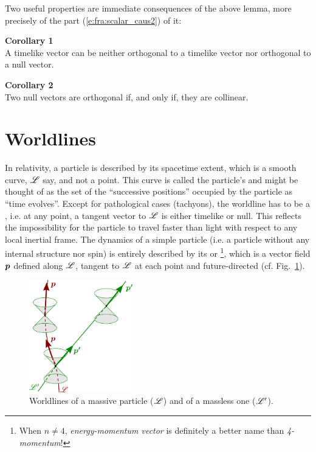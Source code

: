 Two useful properties are immediate consequences of the above lemma,
more precisely of the part (\ref{e:fra:scalar_caus2}) of it:

\begin{greybox}
\textbf{Corollary 1}\\[1ex]
A timelike vector can be neither orthogonal to a timelike vector nor
orthogonal to a null vector.
\end{greybox}

\begin{greybox}
\textbf{Corollary 2}\\[1ex]
Two null vectors are orthogonal if, and only if, they are collinear.
\end{greybox}


\section{Worldlines} \label{s:fra:worldlines}

In relativity, a particle is described by its spacetime extent, which is a smooth curve,
$\mathscr{L}$ say, and not a point. This curve is called the particle's
 and might be thought of as the set of
the ``successive positions'' occupied by the particle as ``time evolves''.
Except for pathological cases (tachyons),
the worldline has to be a , i.e.
at any point, a tangent vector to $\mathscr{L}$  is either timelike or null.
This reflects the impossibility for the particle to travel faster than light with respect
to any local inertial frame.
The dynamics of a simple particle (i.e. a particle without any internal structure nor
spin) is entirely described by its
 or \footnote{When $n\not=4$, \emph{energy-momentum vector} is definitely a better name
than \emph{4-momentum}!}, which is a vector field $\bm{p}$ defined along $\mathscr{L}$,
tangent to $\mathscr{L}$ at each point and future-directed (cf. Fig.~\ref{f:fra:worldline}).

\begin{figure}
\centerline{\includegraphics[width=0.4\textwidth]{fra_worldline.pdf}}
\caption[]{\label{f:fra:worldline} \footnotesize
Worldlines of a massive particle ($\mathscr{L}$) and of a massless one ($\mathscr{L}'$).}
\end{figure}


